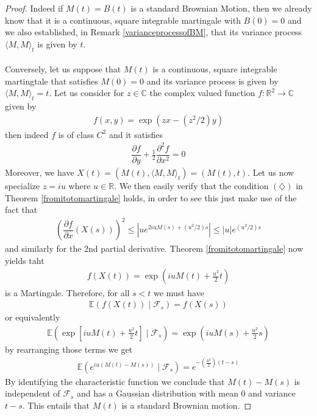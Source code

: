 \documentclass[11pt,a4paper, final]{article}
\begin{document}
\begin{proof}
Indeed if $M(t)=B(t)$ is a standard Brownian Motion, then we already know that it is a continuous, square integrable martingale with $B(0)=0$ and we also established, in Remark \ref{varianceprocessofBM}, that its variance process $\langle M, M \rangle_t$ is given by $t$.
\\\\
Conversely, let us suppose that $M(t)$ is a continuous, square integrable martingtale that satisfies $M(0)=0$ and its variance process is given by $\langle M, M \rangle_t =t$.  Let us consider for $z \in \mathbb{C}$ the complex valued function $f: \mathbb{R}^2 \to \mathbb{C}$ given by 
\begin{align*}
f(x,y)= \exp ( zx-(z^2/2)y)
\end{align*}
then indeed $f$ is of class $C^2$ and it satisfies 
\begin{align*}
\dfrac{\partial f}{\partial y} + \frac{1}{2} \dfrac{\partial^2f}{\partial x^2}=0 
\end{align*}
Moreover, we have $X(t)=(M(t), \langle M, M \rangle_t ) = (M(t), t)$. Let us now specialize $z=iu$ where $u \in \mathbb{R}$. We then easily verify that the condition $(\diamondsuit)$ in Theorem \ref{fromitotomartingale} holds, in order to see this just make use of the fact that 
\begin{align*}
\left( \dfrac{\partial f}{\partial x}(X(s)) \right)^2
\leq \left| u e^{2iu M(s) + (u^2/2) s} \right| \leq |u| e^{(u^2/2)s}
\end{align*} 
and similarly for the 2nd partial derivative. Theorem \ref{fromitotomartingale} now yields taht  
\begin{align*}
f(X(t)) = \exp \left( i u M(t) + \frac{u^2}{2}t \right) 
\end{align*}
is a Martingale. Therefore, for all $s <t$ we must have 
\begin{align*}
\mathbb{E}(f(X(t)) \mid \mathcal{F}_s) = f(X(s))
\end{align*}
or equivalently 
\begin{align*}
\mathbb{E}\left( \exp \left[ i u M(t) + \frac{u^2}{2}t \right] \mid \mathcal{F}_s \right) = \exp \left( i u M(s) + \frac{u^2}{2}s \right) 
\end{align*}
by rearranging those terms we get 
\begin{align*}
\mathbb{E} \left( e^{iu(M(t)-M(s))} \mid \mathcal{F}_s \right) = e^{- \left( \frac{u^2}{2} \right)(t-s)}
\end{align*}
By identifying the characteristic function we conclude that $M(t)-M(s)$ is independent of $\mathcal{F}_s$ and has a Gaussian distribution with mean $0$ and variance $t-s$. This entails that $M(t)$ is a standard Brownian motion. 
\end{proof}
\newpage
\end{document}
